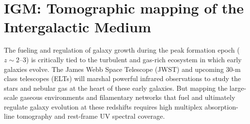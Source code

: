 \documentclass[11pt,a4paper,twoside,onecolumn,openany,final,oldfontcommands]{memoir}
\begin{document}


  


\section{IGM: Tomographic mapping of the Intergalactic Medium}

The fueling and regulation of galaxy growth during the peak formation epoch ($z \sim2$--3) is critically tied to the turbulent and gas-rich ecosystem in which early galaxies evolve. The James Webb Space Telescope (JWST) and upcoming 30-m class telescopes (ELTs) will marshal powerful infrared observations to study the stars and nebular gas at the heart of these early galaxies. But mapping the large-scale gaseous environments and filamentary networks that fuel and ultimately regulate galaxy evolution at these redshifts requires high multiplex absorption-line tomography and rest-frame UV spectral coverage.
\end{document}
